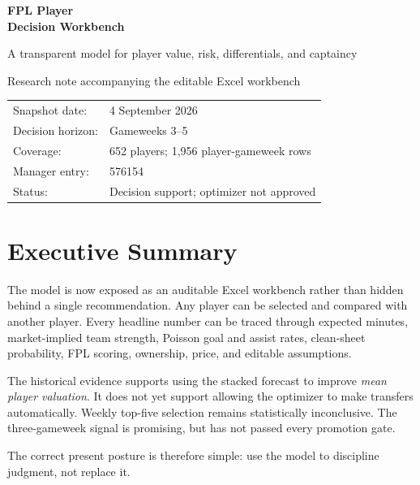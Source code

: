 \documentclass[11pt,a4paper]{article}
\begin{document}
\begin{titlepage}
\pagecolor{Navy}
\color{white}
\vspace*{24mm}
{\Huge\bfseries FPL Player\\Decision Workbench\par}
\vspace{8mm}
{\LARGE A transparent model for player value, risk, differentials, and captaincy\par}
\vspace{18mm}
{\large Research note accompanying the editable Excel workbench\par}
\vfill
\begin{tabular}{@{}ll@{}}
Snapshot date: & 4 September 2026\\
Decision horizon: & Gameweeks 3--5\\
Coverage: & 652 players; 1,956 player-gameweek rows\\
Manager entry: & 576154\\
Status: & Decision support; optimizer not approved\\
\end{tabular}
\vspace{18mm}
\end{titlepage}
\nopagecolor
\color{black}

\tableofcontents
\clearpage
{}

\section{Executive Summary}

The model is now exposed as an auditable Excel workbench rather than hidden behind a single recommendation. Any player can be selected and compared with another player. Every headline number can be traced through expected minutes, market-implied team strength, Poisson goal and assist rates, clean-sheet probability, FPL scoring, ownership, price, and editable assumptions.

The historical evidence supports using the stacked forecast to improve \emph{mean player valuation}. It does not yet support allowing the optimizer to make transfers automatically. Weekly top-five selection remains statistically inconclusive. The three-gameweek signal is promising, but has not passed every promotion gate.

The correct present posture is therefore simple: use the model to discipline judgment, not replace it.
\end{document}
